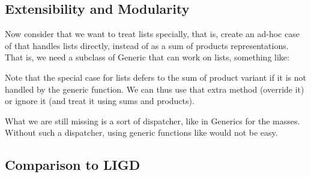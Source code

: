 \subsection{Extensibility and Modularity}
Now consider that we want to treat lists specially, that is, create an
ad-hoc case of  that handles lists directly, instead of as a
sum of products representations. That is, we need a subclass of Generic
that can work on lists, something like:

Note that the special case for lists defers to the sum of product variant
if it is not handled by the generic function. We can thus use that extra
method (override it) or ignore it (and treat it using sums and products).


What we are still missing is a sort of dispatcher, like  in Generics
for the masses. Without such a dispatcher, using generic functions like
 would not be easy.

\subsection{Comparison to LIGD}
